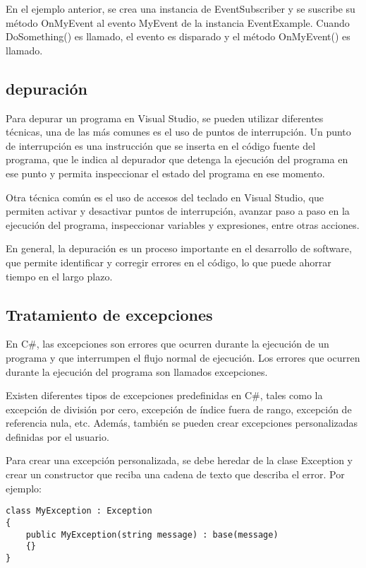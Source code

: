 \documentclass[executivepaper]{article}
\begin{document}
En el ejemplo anterior, se crea una instancia de EventSubscriber y se suscribe su método OnMyEvent al evento MyEvent de la instancia EventExample. Cuando DoSomething() es llamado, el evento es disparado y el método OnMyEvent() es llamado.

\subsection*{depuración}

Para depurar un programa en Visual Studio, se pueden utilizar diferentes técnicas, una de las más comunes es el uso de puntos de interrupción. Un punto de interrupción es una instrucción que se inserta en el código fuente del programa, que le indica al depurador que detenga la ejecución del programa en ese punto y permita inspeccionar el estado del programa en ese momento.

Otra técnica común es el uso de accesos del teclado en Visual Studio, que permiten activar y desactivar puntos de interrupción, avanzar paso a paso en la ejecución del programa, inspeccionar variables y expresiones, entre otras acciones.

En general, la depuración es un proceso importante en el desarrollo de software, que permite identificar y corregir errores en el código, lo que puede ahorrar tiempo en el largo plazo.

\subsection{Tratamiento de excepciones}

En C\#, las excepciones son errores que ocurren durante la ejecución de un programa y que interrumpen el flujo normal de ejecución. Los errores que ocurren durante la ejecución del programa son llamados excepciones.

Existen diferentes tipos de excepciones predefinidas en C\#, tales como la excepción de división por cero, excepción de índice fuera de rango, excepción de referencia nula, etc. Además, también se pueden crear excepciones personalizadas definidas por el usuario.

Para crear una excepción personalizada, se debe heredar de la clase Exception y crear un constructor que reciba una cadena de texto que describa el error. Por ejemplo:

\begin{lstlisting}
class MyException : Exception
{
    public MyException(string message) : base(message)
    {}
}
\end{lstlisting}
\end{document}
